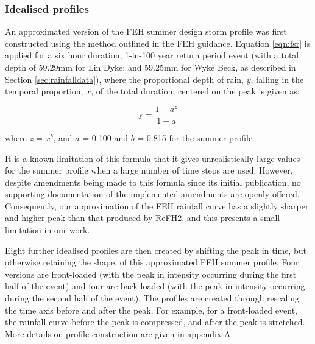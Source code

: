 \documentclass[APA,Times2COL]{WileyNJDv5}
\begin{document}
\subsubsection{Idealised profiles}\label{subsubsec:idealised}
An approximated version of the FEH summer design storm profile was first constructed using the method outlined in the FEH guidance. Equation \ref{eqn:fsr} is applied for a six hour duration, 1-in-100 year return period event  (with a total depth of 59.29mm for Lin Dyke; and 59.25mm for Wyke Beck, as described in Section \ref{sec:rainfalldata}), where the proportional depth of rain, $y$, falling in the temporal proportion, $x$, of the total duration, centered on the peak is given as:

\begin{equation}
\text{y} = \frac{1-a^{z}}{1-a}
  \label{eqn:fsr}
\end{equation}

where \textit{z} = $x^b$, and $a$ = 0.100 and $b$ = 0.815 for the summer profile. 

It is a known limitation of this formula that it gives unrealistically large values for the summer profile when a large number of time steps are used. However, despite amendments being made to this formula since its initial publication, no supporting documentation of the implemented amendments are openly offered. Consequently, our approximation of the FEH rainfall curve has a slightly sharper and higher peak than that produced by ReFH2, and this presents a small limitation in our work. 

Eight further idealised profiles are then created by shifting the peak in time, but otherwise retaining the shape, of this approximated FEH summer profile. Four versions are front-loaded (with the peak in intensity occurring during the first half of the event) and four are back-loaded (with the peak in intensity occurring during the second half of the event). The profiles are created through rescaling the time axis before and after the peak. For example, for a front-loaded event, the rainfall curve before the peak is compressed, and after the peak is stretched. More details on profile construction are given in appendix A.
\end{document}
